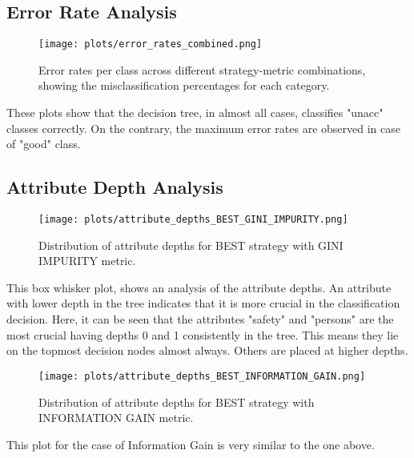 \documentclass[12pt]{article}
\begin{document}
\newpage

\subsection{Error Rate Analysis}
\begin{figure}[H]
    \centering
    \texttt{[image: plots/error\_rates\_combined.png]}
    \caption{Error rates per class across different strategy-metric combinations, showing the misclassification percentages for each category.}
    \label{fig:error-rates}
\end{figure}

These plots show that the decision tree, in almost all cases, classifies "unacc" classes correctly. On the contrary, the maximum error rates are observed in case of "good" class.

\newpage

\subsection{Attribute Depth Analysis}
\begin{figure}[H]
    \centering
    \texttt{[image: plots/attribute\_depths\_BEST\_GINI\_IMPURITY.png]}
    \caption{Distribution of attribute depths for BEST strategy with GINI IMPURITY metric.}
    \label{fig:attr-best-gini}
\end{figure}

This box whisker plot, shows an analysis of the attribute depths. An attribute with lower depth in the tree indicates that it is more crucial in the classification decision. Here, it can be seen that the attributes "safety" and "persons" are the most crucial having depths 0 and 1 consistently in the tree. This means they lie on the topmost decision nodes almost always. Others are placed at higher depths.

\newpage

\begin{figure}[H]
    \centering
    \texttt{[image: plots/attribute\_depths\_BEST\_INFORMATION\_GAIN.png]}
    \caption{Distribution of attribute depths for BEST strategy with INFORMATION GAIN metric.}
    \label{fig:attr-best-ig}
\end{figure}

This plot for the case of Information Gain is very similar to the one above.

\newpage
\end{document}
